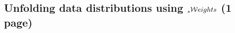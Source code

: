 
\subsection{Unfolding data distributions using \texorpdfstring{$\mbox{\ensuremath{_{s}\mathcal{W}eights}}$}{sWeights} (1 page)}
\label{sec:dataanalysis:selection:splot}
